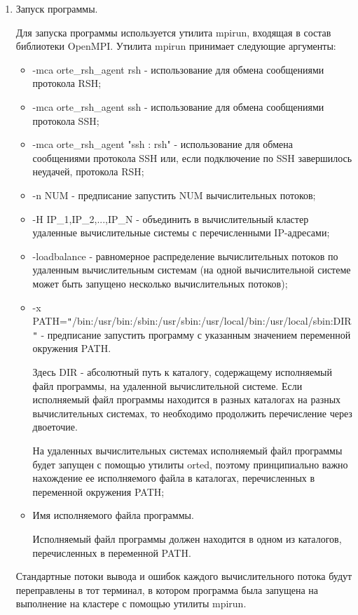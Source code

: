 \begin{enumerate}
\begin{itemize}
	\end{itemize}

	\item Запуск программы.

	Для запуска программы используется утилита mpirun, входящая в состав библиотеки OpenMPI. Утилита mpirun принимает следующие аргументы:

	\begin{itemize}

		\item -mca orte\_rsh\_agent rsh - использование для обмена сообщениями протокола RSH;
		\item -mca orte\_rsh\_agent ssh - использование для обмена сообщениями протокола SSH;
		\item -mca orte\_rsh\_agent "ssh : rsh" - использование для обмена сообщениями протокола SSH или, если подключение по SSH завершилось неудачей, протокола RSH;
		\item -n NUM - предписание запустить NUM вычислительных потоков;
		\item -H IP\_1,IP\_2,...,IP\_N - объединить в вычислительный кластер удаленные вычислительные системы с перечисленными IP-адресами;
		\item -loadbalance - равномерное распределение вычислительных потоков по удаленным вычислительным системам (на одной вычислительной системе может быть запущено несколько вычислительных потоков);
		\item -x PATH=\verb|"|/bin:/usr/bin:/sbin:/usr/sbin:/usr/local/bin:/usr/local/sbin:DIR\verb|"| - предписание запустить программу с указанным значением переменной окружения PATH.

		Здесь DIR - абсолютный путь к каталогу, содержащему исполняемый файл программы, на удаленной вычислительной системе. Если исполняемый файл программы находится в разных каталогах на разных вычислительных системах, то необходимо продолжить перечисление через двоеточие.

		На удаленных вычислительных системах исполняемый файл программы будет запущен с помощью утилиты orted, поэтому принципиально важно нахождение ее исполняемого файла в каталогах, перечисленных в переменной окружения PATH;

		\item Имя исполняемого файла программы.

		Исполняемый файл программы должен находится в одном из каталогов, перечисленных в переменной PATH.

	\end{itemize}

	Стандартные потоки вывода и ошибок каждого вычислительного потока будут переправлены в тот терминал, в котором программа была запущена на выполнение на кластере с помощью утилиты mpirun.

\end{enumerate}

